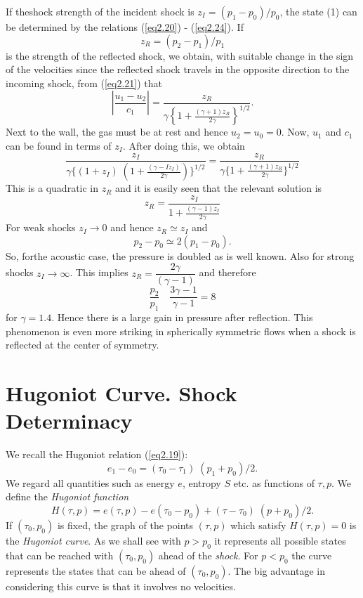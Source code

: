 If the\pageoriginale shock strength of the incident shock is $z_I = (p_1 - p_0)/ p_0$, the state (1) can be determined by the relations (\ref{eq2.20}) - (\ref{eq2.24}). If
$$
z_R = (p_2 - p_1)/p_1
$$
is the strength of the reflected shock, we obtain, with suitable change in the sign of the velocities since the reflected shock travels in the opposite direction to the incoming shock, from (\ref{eq2.21}) that
$$
|\frac{u_1 - u_2}{c_1}| = \frac{z_R}{\gamma \left\{1+\frac{(\gamma + 1)z_R}{2\gamma}  \right\}^{1/2}}.
$$
Next to the wall, the gas must be at rest and hence $u_2 = u_0 = 0$. Now, $u_1$ and $c_1$ can be found in terms of $z_I$. After doing this, we obtain
$$
\frac{z_I}{\gamma\{(1+z_I) \; (1+\frac{(\gamma - Iz_I)}{2\gamma})\}^{1/2}} = \frac{z_R}{ \gamma \{1+\frac{(\gamma + 1)z_R}{2\gamma}\}^{1/2}}
$$
This is a quadratic in $z_R$ and it is easily seen that the relevant solution is 
$$
z_R = \frac{z_I}{1 + \frac{(\gamma -1)z_I}{2\gamma}}
$$
For weak shocks $z_I \to 0$ and hence $z_R \simeq z_I$ and 
$$
p_2 - p_0 \simeq 2 (p_1 - p_0). 
$$
So, for\pageoriginale the acoustic case, the pressure is doubled as is well known. Also for strong shocks $z_I \to \infty$. This implies $z_R = \dfrac{2\gamma}{(\gamma -1)}$ and therefore
$$
\frac{p_2}{p_1} \quad \frac{3\gamma -1}{\gamma -1} = 8
$$
for $\gamma = 1.4$. Hence there is a large gain in pressure after reflection. This phenomenon is even more striking in spherically symmetric flows when a shock is reflected at the center of symmetry.

\section{Hugoniot Curve. Shock Determinacy}\label{chap2:sec2.7}
We recall the Hugoniot relation (\ref{eq2.19}):
$$
e_1 - e_0 = (\tau_0 - \tau_1) \; (p_1 + p_0 ) /2.
$$
We regard all quantities such as energy $e$, entropy $S$ etc. as functions of $\tau, p$. We define the {\em Hugoniot function}
$$
H(\tau, p) = e(\tau, p) - e(\tau_0 - p_0) + (\tau - \tau_0) \; (p+p_0) /2. 
$$
If $(\tau_0 , p_0)$ is fixed, the graph of the points $(\tau, p)$ which satisfy $H(\tau, p) = 0$ is the {\em Hugoniot curve}. As we shall see with $p>p_0$ it represents all possible states that can be reached with $(\tau_0, p_0)$ ahead of the {\em shock}. For $p<p_0$ the curve represents the states that can be ahead of $(\tau_0, p_0)$. The big advantage in considering this curve is that it involves no velocities.

